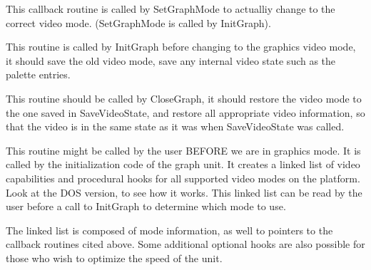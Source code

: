 
This callback routine is called by SetGraphMode to actualliy change to
the correct video mode. (SetGraphMode is called by InitGraph).


This routine is called by InitGraph before changing to the graphics video
mode, it should save the old video mode, save any internal video state
such as the palette entries.


This routine should be called by CloseGraph, it should restore the video
mode to the one saved in SaveVideoState, and restore all appropriate video
information, so that the video is in the same state as it was when
SaveVideoState was called.


This routine might be called by the user BEFORE we are in graphics
mode. It is called by the initialization code of the graph unit. It
creates a linked list of video capabilities and procedural hooks for
all supported video modes on the platform. Look at the DOS version,
to see how it works. This linked list can be read by the user before a
call to InitGraph to determine which mode to use.

The linked list is composed of mode information, as well to pointers
to the callback routines cited above. Some additional optional hooks
are also possible for those who wish to optimize the speed of the unit.


